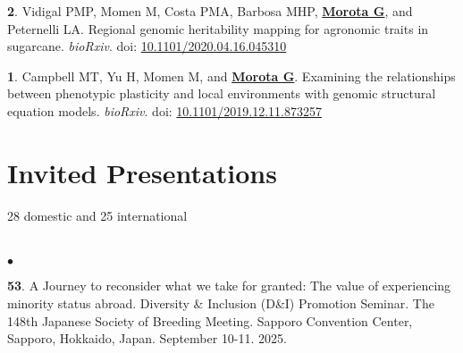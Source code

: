 \documentclass[margin,line,10pt]{res}
\newenvironment{list1}{
  \begin{list}{\ding{113}}{%
      \setlength{\itemsep}{0in}
      \setlength{\parsep}{0in} \setlength{\parskip}{0in}
      \setlength{\topsep}{0in} \setlength{\partopsep}{0in} 
      \setlength{\leftmargin}{0.17in}}}{\end{list}}
\newenvironment{list2}{
  \begin{list}{$\bullet$}{%
      \setlength{\itemsep}{0in}
      \setlength{\parsep}{0in} \setlength{\parskip}{0in}
      \setlength{\topsep}{0in} \setlength{\partopsep}{0in} 
      \setlength{\leftmargin}{0.2in}}}{\end{list}}
\begin{document}
\begin{resume}
\begin{list1}

  \item [{\bf 2}.] Vidigal PMP, Momen M, Costa PMA, Barbosa MHP, \textbf{\underline{Morota G}}, and Peternelli LA. Regional genomic heritability mapping for agronomic traits in sugarcane. \emph{bioRxiv}. doi: \textcolor{blue}{\href{https://doi.org/10.1101/2020.04.16.045310}{10.1101/2020.04.16.045310}}

  \vspace{0.5cm}

\item [{\bf 1}.] Campbell MT, Yu H, Momen M, and \textbf{\underline{Morota G}}. Examining the relationships between phenotypic plasticity and local environments with genomic structural equation models. \emph{bioRxiv}. doi: \textcolor{blue}{\href{https://doi.org/10.1101/2019.12.11.873257}{10.1101/2019.12.11.873257}}
  

\end{list1}




\vspace{1.0cm}
\section{\sc Invited Presentations}
\vspace{0.5cm}
28 domestic and 25 international \\
\noindent




\section{}
\begin{list2}

  \item [{\bf 53}.]  A Journey to reconsider what we take for granted: The value of experiencing minority status abroad. Diversity \& Inclusion (D\&I) Promotion Seminar. The 148th Japanese Society of Breeding Meeting. Sapporo Convention Center, Sapporo, Hokkaido, Japan. September 10-11. 2025. %

  \vspace{0.5cm}


\end{list2}
\end{resume}
\end{document}
